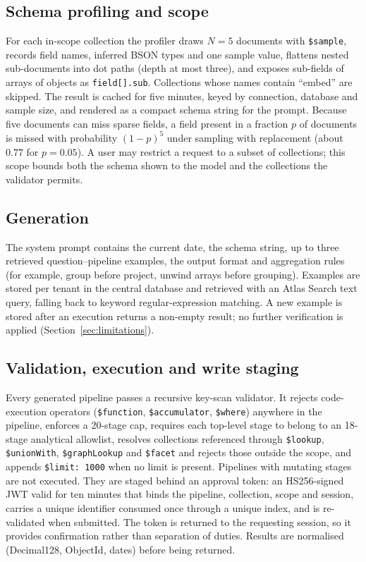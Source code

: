 \subsection{Schema profiling and scope}
For each in-scope collection the profiler draws $N{=}5$ documents with \texttt{\$sample}, records field names, inferred BSON types and one sample value, flattens nested sub-documents into dot paths (depth at most three), and exposes sub-fields of arrays of objects as \texttt{field[].sub}. Collections whose names contain ``embed'' are skipped. The result is cached for five minutes, keyed by connection, database and sample size, and rendered as a compact schema string for the prompt. Because five documents can miss sparse fields, a field present in a fraction $p$ of documents is missed with probability $(1-p)^5$ under sampling with replacement (about $0.77$ for $p{=}0.05$). A user may restrict a request to a subset of collections; this scope bounds both the schema shown to the model and the collections the validator permits.

\subsection{Generation}
The system prompt contains the current date, the schema string, up to three retrieved question--pipeline examples, the output format and aggregation rules (for example, group before project, unwind arrays before grouping). Examples are stored per tenant in the central database and retrieved with an Atlas Search text query, falling back to keyword regular-expression matching. A new example is stored after an execution returns a non-empty result; no further verification is applied (Section~\ref{sec:limitations}).

\subsection{Validation, execution and write staging}
Every generated pipeline passes a recursive key-scan validator. It rejects code-execution operators (\texttt{\$function}, \texttt{\$accumulator}, \texttt{\$where}) anywhere in the pipeline, enforces a 20-stage cap, requires each top-level stage to belong to an 18-stage analytical allowlist, resolves collections referenced through \texttt{\$lookup}, \texttt{\$unionWith}, \texttt{\$graphLookup} and \texttt{\$facet} and rejects those outside the scope, and appends \texttt{\$limit: 1000} when no limit is present. Pipelines with mutating stages are not executed. They are staged behind an approval token: an HS256-signed JWT valid for ten minutes that binds the pipeline, collection, scope and session, carries a unique identifier consumed once through a unique index, and is re-validated when submitted. The token is returned to the requesting session, so it provides confirmation rather than separation of duties. Results are normalised (Decimal128, ObjectId, dates) before being returned.


